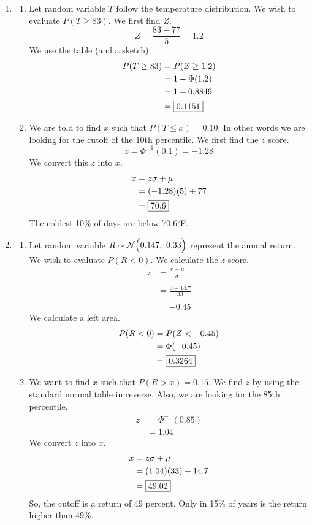 \documentclass[12pt,letterpaper]{article}
\begin{document}
\begin{enumerate}
\item \begin{enumerate}
\item Let random variable $T$ follow the temperature distribution. We wish to evaluate $P(T\ge 83)$. We first find $Z$.
$$Z = \frac{83-77}{5} = 1.2$$
We use the table (and a sketch).
\begin{align*}
P(T\ge 83) &= P(Z\ge 1.2) \\
             &= 1 - \Phi(1.2)\\
             &= 1 - 0.8849\\
             &= \fbox{0.1151}
\end{align*}
\item We are told to find $x$ such that $P(T \le x) = 0.10$. In other words we are looking for the cutoff of the 10th percentile. We first find the $z$ score.
$$z = \Phi^{-1}(0.1) = -1.28$$
We convert this $z$ into $x$.
\begin{align*}
x &= z\sigma + \mu \\
  &= (-1.28)(5) + 77\\
   &= \fbox{70.6}
\end{align*}
The coldest 10\% of days are below 70.6$^\circ$F.
\end{enumerate}
\newpage
\item \begin{enumerate}
\item Let random variable $R\sim \mathcal{N}\Big(0.147,~ 0.33\Big)$ represent the annual return. We wish to evaluate $P(R < 0)$.
We calculate the $z$ score.
\begin{align*}
z &= \frac{x-\mu}{\sigma} \\\\
  &= \frac{0-14.7}{33}\\\\
  &= -0.45
\end{align*}
We calculate a left area.
\begin{align*}
P(R < 0) &= P(Z < -0.45) \\
             &= \Phi(-0.45)\\
             &= \fbox{0.3264}
\end{align*}
\item We want to find $x$ such that $P(R>x) = 0.15$. We find $z$ by using the standard normal table in reverse. Also, we are looking for the 85th percentile.
\begin{align*}
z &= \Phi^{-1}(0.85) \\
  &= 1.04
\end{align*}
We convert $z$ into $x$.
\begin{align*}
x &= z\sigma + \mu \\
  &= (1.04)(33) + 14.7\\
   &= \fbox{49.02}
\end{align*}
So, the cutoff is a return of 49 percent. Only in 15\% of years is the return higher than 49\%.
\end{enumerate}

\end{enumerate}
\end{document}
